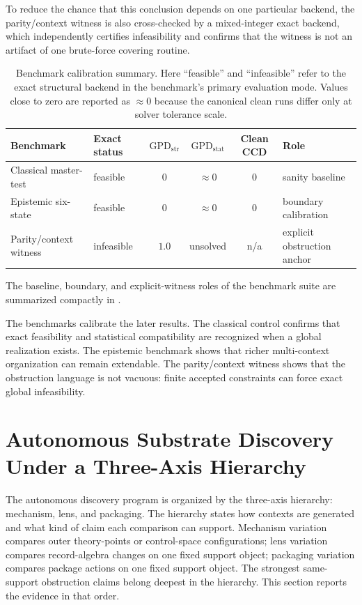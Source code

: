 \documentclass[11pt]{article}
\newcommand{\GPDstr}{\mathrm{GPD}_{\mathrm{str}}}
\newcommand{\GPDstat}{\mathrm{GPD}_{\mathrm{stat}}}
\theoremstyle{definition}
\begin{document}
To reduce the chance that this conclusion depends on one particular backend, the parity/context witness is also cross-checked by a mixed-integer exact backend, which independently certifies infeasibility and confirms that the witness is not an artifact of one brute-force covering routine.

\begin{table}[t]
    \centering
    \small
    \caption{Benchmark calibration summary. Here ``feasible'' and ``infeasible'' refer to the exact structural backend in the benchmark's primary evaluation mode. Values close to zero are reported as \(\approx 0\) because the canonical clean runs differ only at solver tolerance scale.}
    \label{tab:benchmark-summary}
    \begin{tabularx}{\textwidth}{@{}l l c c c X@{}}
        \toprule
        Benchmark & Exact status & \(\GPDstr\) & \(\GPDstat\) & Clean CCD & Role \\
        \midrule
        Classical master-test & feasible & \(0\) & \(\approx 0\) & \(0\) & sanity baseline \\
        Epistemic six-state & feasible & \(0\) & \(\approx 0\) & \(0\) & boundary calibration \\
        Parity/context witness & infeasible & \(1.0\) & unsolved & n/a & explicit obstruction anchor \\
        \bottomrule
    \end{tabularx}
\end{table}

The baseline, boundary, and explicit-witness roles of the benchmark suite are summarized compactly in .

The benchmarks calibrate the later results. The classical control confirms that exact feasibility and statistical compatibility are recognized when a global realization exists. The epistemic benchmark shows that richer multi-context organization can remain extendable. The parity/context witness shows that the obstruction language is not vacuous: finite accepted constraints can force exact global infeasibility.

\section{Autonomous Substrate Discovery Under a Three-Axis Hierarchy}\label{sec:discovery}
The autonomous discovery program is organized by the three-axis hierarchy: mechanism, lens, and packaging. The hierarchy states how contexts are generated and what kind of claim each comparison can support. Mechanism variation compares outer theory-points or control-space configurations; lens variation compares record-algebra changes on one fixed support object; packaging variation compares package actions on one fixed support object. The strongest same-support obstruction claims belong deepest in the hierarchy. This section reports the evidence in that order.
\end{document}
